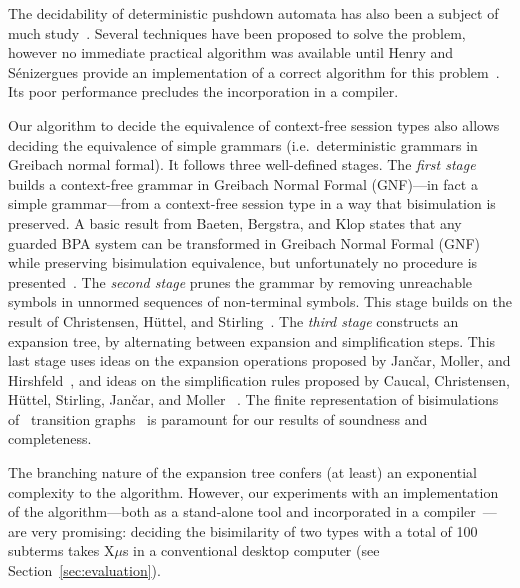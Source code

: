 
The decidability of deterministic pushdown automata has
also been a subject of much
study~\cite{janvcar2008selected,senizergues1997equivalence,stirling2001decidability}.
Several techniques have been proposed to solve the problem, however no
immediate practical algorithm was available until Henry and
S{\'e}nizergues provide an implementation of a correct algorithm for
this problem~\cite{henry2013lalblc}. Its poor performance precludes
the incorporation in a compiler.

Our algorithm to decide the equivalence of context-free session types
also allows deciding the equivalence of simple grammars
(i.e.\ deterministic grammars in Greibach normal formal).  It follows
three well-defined stages.
%
The \emph{first stage} builds a context-free grammar in Greibach
Normal Formal (GNF)---in fact a simple grammar---from a context-free
session type in a way that bisimulation is preserved.  A basic result
from Baeten, Bergstra, and Klop states that any guarded BPA system can
be transformed in Greibach Normal Formal (GNF) while preserving
bisimulation equivalence, but unfortunately no procedure is
presented~\cite{baeten1993decidability}.
%
The \emph{second stage} prunes the grammar by removing unreachable
symbols in unnormed sequences of non-terminal symbols. This stage
builds on the result of Christensen, H\"uttel, and 
Stirling~\cite{DBLP:journals/iandc/ChristensenHS95}.
%
The \emph{third stage} constructs an expansion tree, by alternating
between expansion and simplification steps.  This last stage uses
ideas on the expansion operations proposed by Jan\v car, Moller, and
Hirshfeld~\cite{hirshfeld1996bisimulation,janvcar1999techniques}, and
ideas on the simplification rules proposed by Caucal, Christensen,
H\"uttel, Stirling, Jan\v car, and Moller
~\cite{caucal1986decidabilite,DBLP:journals/iandc/ChristensenHS95,janvcar1999techniques}.
The finite representation of bisimulations of \BPA\ transition
graphs~\cite{caucal1986decidabilite,DBLP:journals/iandc/ChristensenHS95}
is paramount for our results of soundness and completeness.


The branching nature of the expansion tree confers (at least) an
exponential complexity to the algorithm.
%
However, our experiments with an implementation of the
algorithm---both as a stand-alone tool and incorporated in a
compiler~\cite{almeida.etal_freest-functional-language}---are very
promising: deciding the bisimilarity of two types with a total of 100
subterms takes X$\mu$s in a conventional desktop computer (see
Section~\ref{sec:evaluation}).

